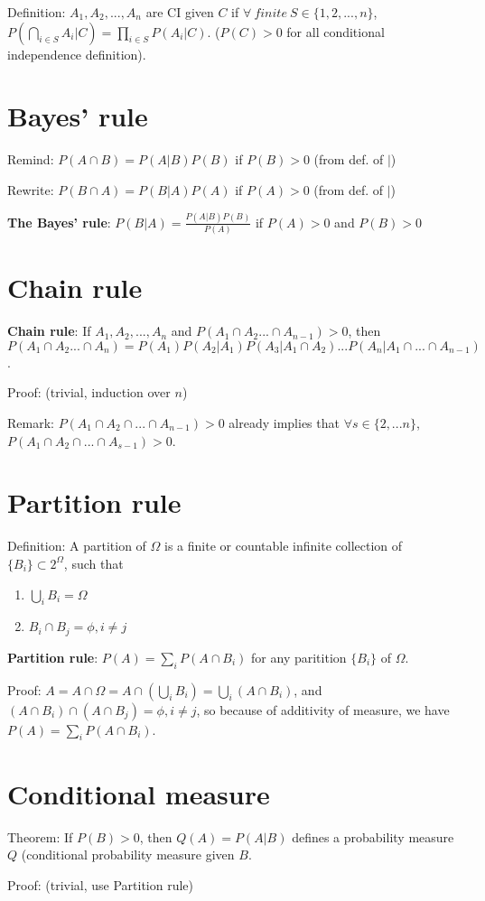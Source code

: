 \documentclass[12pt]{article}
\begin{document}
Definition: $A_1, A_2,...,A_n$ are CI given $C$ if $\forall\ finite\ S\in \{1,2,...,n\}$,
$P(\bigcap\limits_{i\in S} A_i|C)=\prod\limits_{i\in S} P(A_i|C)$. ($P(C) > 0$ for all conditional
independence definition).

\section{Bayes' rule}

Remind: $P(A\cap B) = P(A|B)P(B)$ if $P(B) > 0$ (from def. of $|$)

Rewrite: $P(B\cap A) = P(B|A) P(A)$ if $P(A) > 0$ (from def. of $|$)
\bigbreak

\textbf{The Bayes' rule}: $P(B|A)=\frac{P(A|B)P(B)}{P(A)}$ if $P(A)>0$ and $P(B)>0$

\section{Chain rule}

\textbf{Chain rule}: If $A_1,A_2,...,A_n$ and $P(A_1\cap A_2...\cap A_{n-1}) > 0$,
then $P(A_1\cap A_2...\cap A_n) = P(A_1)P(A_2|A_1)P(A_3|A_1\cap A_2)...P(A_n|A_1\cap ... \cap A_{n-1})$.

Proof: (trivial, induction over $n$)

Remark: $P(A_1\cap A_2\cap ... \cap A_{n-1})>0$ already implies that $\forall s\in \{2,...n\}$,
$P(A_1\cap A_2\cap ...\cap A_{s-1}) > 0$.

\section{Partition rule}

Definition: A partition of $\Omega$ is a finite or countable infinite collection
of $\{B_i\}\subset 2^{\Omega}$, such that
\begin{enumerate}
    \item $\bigcup\limits_i B_i = \Omega$
    \item $B_i\cap B_j = \phi, i\neq j$
\end{enumerate}

\textbf{Partition rule}: $P(A) = \sum\limits_i P(A\cap B_i)$ for any paritition $\{B_i\}$ of $\Omega$.

Proof: $A=A\cap \Omega=A\cap (\bigcup\limits_i B_i)=\bigcup\limits_i (A\cap B_i)$, and
$(A\cap B_i)\cap (A\cap B_j)=\phi, i\neq j$, so because of additivity of measure,
we have $P(A) = \sum\limits_i P(A\cap B_i)$.

\section{Conditional measure}

Theorem: If $P(B)>0$, then $Q(A)=P(A|B)$ defines a probability measure $Q$ (conditional
probability measure given $B$.

Proof: (trivial, use Partition rule)
\end{document}
